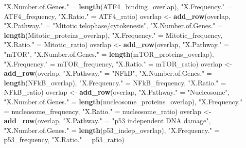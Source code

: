 \documentclass[]{article}
\newenvironment{Shaded}{\begin{snugshade}}{\end{snugshade}}
\newcommand{\KeywordTok}[1]{\textcolor[rgb]{0.13,0.29,0.53}{\textbf{#1}}}
\newcommand{\NormalTok}[1]{#1}
\newcommand{\StringTok}[1]{\textcolor[rgb]{0.31,0.60,0.02}{#1}}
\begin{document}
\begin{Shaded}
\begin{Highlighting}[]
                   \StringTok{"X.Number.of.Genes."}\NormalTok{ =}\StringTok{ }\KeywordTok{length}\NormalTok{(ATF4_binding_overlap), }
                   \StringTok{"X.Frequency."}\NormalTok{ =}\StringTok{ }\NormalTok{ATF4_frequency, }\StringTok{"X.Ratio."}\NormalTok{ =}\StringTok{ }\NormalTok{ATF4_ratio)}
\NormalTok{overlap <-}\StringTok{ }\KeywordTok{add_row}\NormalTok{(overlap, }\StringTok{"X.Pathway."}\NormalTok{ =}\StringTok{ "Mitotic telophase/cytokenesis"}\NormalTok{,}
                   \StringTok{"X.Number.of.Genes."}\NormalTok{ =}\StringTok{ }\KeywordTok{length}\NormalTok{(Mitotic_proteins_overlap),}
                   \StringTok{"X.Frequency."}\NormalTok{ =}\StringTok{ }\NormalTok{Mitotic_frequency, }\StringTok{"X.Ratio."}\NormalTok{ =}\StringTok{ }\NormalTok{Mitotic_ratio)}
\NormalTok{overlap <-}\StringTok{ }\KeywordTok{add_row}\NormalTok{(overlap, }\StringTok{"X.Pathway."}\NormalTok{ =}\StringTok{ "mTOR"}\NormalTok{,}
                   \StringTok{"X.Number.of.Genes."}\NormalTok{ =}\StringTok{ }\KeywordTok{length}\NormalTok{(mTOR_proteins_overlap), }
                   \StringTok{"X.Frequency."}\NormalTok{ =}\StringTok{ }\NormalTok{mTOR_frequency, }\StringTok{"X.Ratio."}\NormalTok{ =}\StringTok{ }\NormalTok{mTOR_ratio)}
\NormalTok{overlap <-}\StringTok{ }\KeywordTok{add_row}\NormalTok{(overlap, }\StringTok{"X.Pathway."}\NormalTok{ =}\StringTok{ "NFkB"}\NormalTok{,}
                   \StringTok{"X.Number.of.Genes."}\NormalTok{ =}\StringTok{ }\KeywordTok{length}\NormalTok{(NFkB_overlap), }
                   \StringTok{"X.Frequency."}\NormalTok{ =}\StringTok{ }\NormalTok{NFkB_frequency, }\StringTok{"X.Ratio."}\NormalTok{ =}\StringTok{ }\NormalTok{NFkB_ratio)}
\NormalTok{overlap <-}\StringTok{ }\KeywordTok{add_row}\NormalTok{(overlap, }\StringTok{"X.Pathway."}\NormalTok{ =}\StringTok{ "Nucleosome"}\NormalTok{,}
                   \StringTok{"X.Number.of.Genes."}\NormalTok{ =}\StringTok{ }\KeywordTok{length}\NormalTok{(nucleosome_proteins_overlap), }
                   \StringTok{"X.Frequency."}\NormalTok{ =}\StringTok{ }\NormalTok{nucleosome_frequency, }\StringTok{"X.Ratio."}\NormalTok{ =}\StringTok{ }\NormalTok{nucleosome_ratio)}
\NormalTok{overlap <-}\StringTok{ }\KeywordTok{add_row}\NormalTok{(overlap, }\StringTok{"X.Pathway."}\NormalTok{ =}\StringTok{ "p53 independent DNA damage"}\NormalTok{,}
                   \StringTok{"X.Number.of.Genes."}\NormalTok{ =}\StringTok{ }\KeywordTok{length}\NormalTok{(p53_indep_overlap), }
                   \StringTok{"X.Frequency."}\NormalTok{ =}\StringTok{ }\NormalTok{p53_frequency, }\StringTok{"X.Ratio."}\NormalTok{ =}\StringTok{ }\NormalTok{p53_ratio)}

\end{Highlighting}
\end{Shaded}
\end{document}
